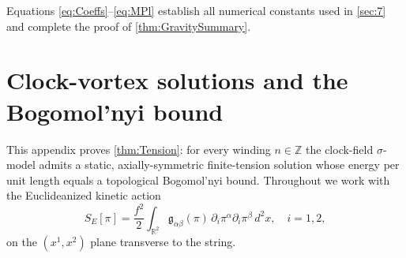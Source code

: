 \documentclass[pdflatex,sn-mathphys-num]{sn-jnl}
\theoremstyle{thmstyleone}
\theoremstyle{thmstyletwo}%
\theoremstyle{thmstylethree}%
\begin{document}
\begin{appendices}
Equations \eqref{eq:Coeffs}--\eqref{eq:MPl} establish all numerical
constants used in \autoref{sec:7} and complete the proof of \autoref{thm:GravitySummary}.

\section{Clock-vortex solutions and the Bogomol’nyi bound}
\label{app:Vortex}
This appendix proves \autoref{thm:Tension}: for every winding
\(n\in\mathbb Z\) the clock-field $\sigma$-model admits a static,
axially-symmetric finite-tension solution whose energy
per unit length equals a topological Bogomol’nyi bound.
Throughout we work with the Euclideanized kinetic action
\[
  S_E[\pi]
  = \frac{f^{2}}{2}\int_{\mathbb R^{2}}
      \mathfrak g_{\alpha\beta}(\pi)\,
      \partial_{i}\pi^{\alpha}\partial_{i}\pi^{\beta}\,d^{2}x,
  \quad i=1,2,
\]
on the $(x^{1},x^{2})$ plane transverse to the string.


\end{appendices}
\end{document}
